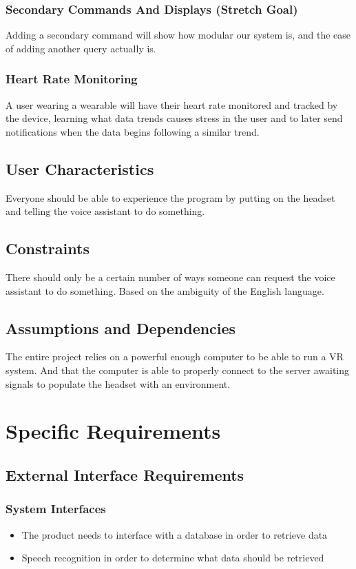 \documentclass[onecolumn, draftclsnofoot,10pt, compsoc]{IEEEtran}
\begin{document}
        \subsubsection{Secondary Commands And Displays (Stretch Goal)}
            Adding a secondary command will show how modular our system is, and the ease of adding another query actually is. 
        
        \subsubsection{Heart Rate Monitoring}
            A user wearing a wearable will have their heart rate monitored and tracked by the device, learning what data trends causes stress in the user and to later send notifications when the data begins following a similar trend. 
        
    \subsection{User Characteristics}
        Everyone should be able to experience the program by putting on the headset and telling the voice assistant to do something. 
    
    \subsection{Constraints}
        There should only be a certain number of ways someone can request the voice assistant to do something. Based on the ambiguity of the English language.

    \subsection{Assumptions and Dependencies}
        The entire project relies on a powerful enough computer to be able to run a VR system. And that the computer is able to properly connect to the server awaiting signals to populate the headset with an environment. 

\section{Specific Requirements}
    \subsection{External Interface Requirements}
        \subsubsection{System Interfaces}
            \begin{itemize}
                \item The product needs to interface with a database in order to retrieve data
                \item Speech recognition in order to determine what data should be retrieved
            \end{itemize}
\end{document}
